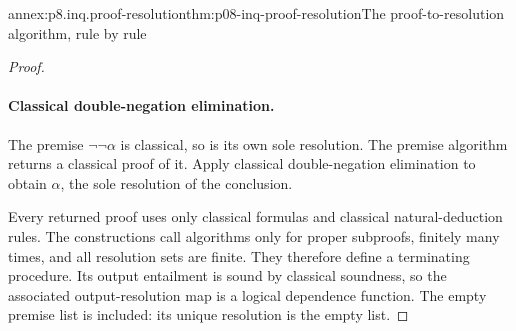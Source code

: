 \begin{annexitem}{annex:p8.inq.proof-resolution}{thm:p08-inq-proof-resolution}{The proof-to-resolution algorithm, rule by rule}
\begin{proof}
\paragraph{Classical double-negation elimination.}
The premise \(\neg\neg\alpha\) is classical, so is its own sole resolution.
The premise algorithm returns a classical proof of it. Apply classical
double-negation elimination to obtain \(\alpha\), the sole resolution
of the conclusion.

Every returned proof uses only classical formulas and classical
natural-deduction rules. The constructions call algorithms only for
proper subproofs, finitely many times, and all resolution sets are finite.
They therefore define a terminating procedure. Its output entailment is
sound by classical soundness, so the associated output-resolution map is
a logical dependence function. The empty premise list is included: its
unique resolution is the empty list.
\end{proof}
\end{annexitem}

